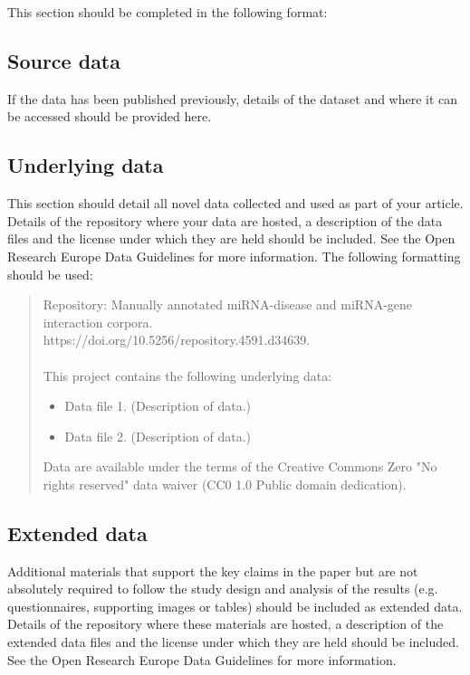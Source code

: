 \documentclass[10pt,a4paper]{article}
\begin{document}
This section should be completed in the following format:

\subsection*{Source data}

If the data has been published previously, details of the dataset and where it can be accessed should be provided here.

\subsection*{Underlying data}

This section should detail all novel data collected and used as part of your article. Details of the repository where your data are hosted, a description of the data files and the license under which they are held should be included. See the Open Research Europe Data Guidelines for more information. The following formatting should be used:
\begin{quote}
Repository: Manually annotated miRNA-disease and miRNA-gene interaction corpora.\\
https://doi.org/10.5256/repository.4591.d34639.
\\
\\
This project contains the following underlying data:
\begin{itemize}
	\item Data file 1. (Description of data.)
	\item Data file 2. (Description of data.)
\end{itemize}

Data are available under the terms of the Creative Commons Zero "No rights reserved" data waiver (CC0 1.0 Public domain dedication).
\end{quote}
\subsection*{Extended data}

Additional materials that support the key claims in the paper but are not absolutely required to follow the study design and analysis of the results (e.g. questionnaires, supporting images or tables) should be included as extended data. Details of the repository where these materials are hosted, a description of the extended data files and the license under which they are held should be included. See the Open Research Europe Data Guidelines for more information.
\end{document}
